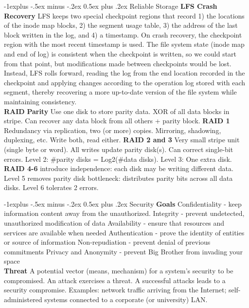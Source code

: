 \documentclass[9pt,landscape]{article}
\makeatletter
\renewcommand{\subsection}{\@startsection{subsection}{2}{0mm}%
                                {-1explus -.5ex minus -.2ex}%
                                {0.5ex plus .2ex}%
                                {\normalfont\normalsize\bfseries}}
\makeatother
\begin{document}
\begin{multicols}{3}
\subsection{Reliable Storage}
{\bf LFS Crash Recovery} LFS keeps two special checkpoint regions that record 1) the locations of the inode map blocks, 2) the segment usage table, 3) the address of the last block written in the log, and 4) a timestamp. On crash recovery, the checkpoint region with the most recent timestamp is used. The file system state (inode map and end of log) is consistent when the checkpoint is written, so we could start from that point, but modifications made between checkpoints would be lost. Instead, LFS rolls forward, reading the log from the end location recorded in the checkpoint and applying changes according to the operation log stored with each segment, thereby recovering a more up-to-date version of the file system while maintaining consistency.\\
{\bf RAID} {\bf Parity} Use one disk to store parity data. XOR of all data blocks in stripe. Can recover any data block from all others + parity block. 
{\bf RAID 1} Redundancy via replication, two (or more) copies. Mirroring, shadowing, duplexing, etc. Write both, read either.
{\bf RAID 2 and 3} Very small stripe unit (single byte or word). All writes update parity disk(s). Can correct single-bit errors. Level 2: \#parity disks = Log2(\#data disks). Level 3: One extra disk.
{\bf RAID 4-6} introduce independence: each disk may be writing different data. Level 5 removes parity disk bottleneck: distributes parity bits across all data disks. Level 6 tolerates 2 errors.


\subsection{Security}
{\bf Goals} Confidentiality - keep information content away from the unauthorized.
Integrity - prevent undetected, unauthorized modification of data
Availability - ensure that resources and services are available when needed
Authentication - prove the identity of entities or source of information
Non-repudiation - prevent denial of previous commitments
Privacy and Anonymity - prevent Big Brother from invading your space\\

{\bf Threat} A potential vector (means, mechanism) for a system’s security to be compromised. An attack exercises a threat. A successful attacks leads to a security compromise. Examples: network traffic arriving from the Internet; self-administered systems connected to a corporate (or university) LAN.\\


\end{multicols}
\end{document}
